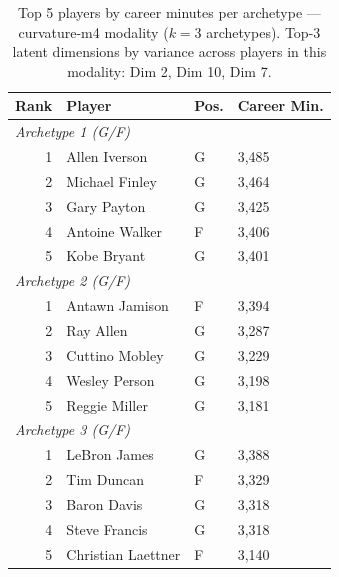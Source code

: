 \begin{table}[htbp]
  \centering\small
  \begin{tabular}{rlll}
    \toprule
    Rank & Player & Pos. & Career Min. \\
    \midrule
    \multicolumn{4}{l}{\textit{Archetype 1 (G/F)}} \\
    \midrule
    1 & Allen Iverson & G & 3,485 \\
    2 & Michael Finley & G & 3,464 \\
    3 & Gary Payton & G & 3,425 \\
    4 & Antoine Walker & F & 3,406 \\
    5 & Kobe Bryant & G & 3,401 \\
    \midrule[0.4pt]
    \multicolumn{4}{l}{\textit{Archetype 2 (G/F)}} \\
    \midrule
    1 & Antawn Jamison & F & 3,394 \\
    2 & Ray Allen & G & 3,287 \\
    3 & Cuttino Mobley & G & 3,229 \\
    4 & Wesley Person & G & 3,198 \\
    5 & Reggie Miller & G & 3,181 \\
    \midrule[0.4pt]
    \multicolumn{4}{l}{\textit{Archetype 3 (G/F)}} \\
    \midrule
    1 & LeBron James & G & 3,388 \\
    2 & Tim Duncan & F & 3,329 \\
    3 & Baron Davis & G & 3,318 \\
    4 & Steve Francis & G & 3,318 \\
    5 & Christian Laettner & F & 3,140 \\
    \bottomrule
  \end{tabular}
  \caption{Top 5 players by career minutes per archetype --- curvature-m4 modality ($k=3$ archetypes). Top-3 latent dimensions by variance across players in this modality: Dim 2, Dim 10, Dim 7.}
  \label{tab:arch_reps_curvature_m4}
\end{table}

